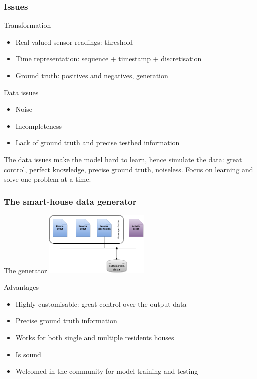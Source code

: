 \documentclass[10pt]{beamer}
\begin{document}
\begin{frame}[plain]
  \frametitle{Issues}

  \begin{block}{Transformation}
    \begin{itemize}
      \item Real valued sensor readings: threshold
      \item Time representation: sequence + timestamp + discretisation
      \item Ground truth: positives and negatives, generation
    \end{itemize}
  \end{block}

  \begin{block}{Data issues}
    \begin{itemize}
      \item Noise
      \item Incompleteness
      \item Lack of ground truth and precise testbed information
    \end{itemize}
  \end{block}

\vspace*{1.5em}The data issues make the model hard to learn, hence simulate the data: great control, perfect knowledge, precise ground truth, noiseless. Focus on learning and solve one problem at a time.

\end{frame}


\begin{frame}[plain]
  \frametitle{The smart-house data generator}

  \begin{block}{The generator}
      \centering\noindent\includegraphics[width=5cm]{./gfx/gen}
  \end{block}

  \begin{block}{Advantages}
  \begin{itemize}
    \item Highly customisable: great control over the output data
    \item Precise ground truth information
    \item Works for both single and multiple residents houses
    \item Is sound
    \item Welcomed in the community for model training and testing
  \end{itemize}
  \end{block}

\end{frame}
\end{document}
